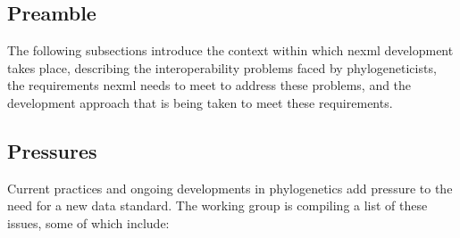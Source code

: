 \documentclass{article}
\begin{document}
\subsection{Preamble} The following subsections introduce the context
within which nexml development takes place, describing the
interoperability problems faced by phylogeneticists, the requirements
nexml needs to meet to address these problems, and the development
approach that is being taken to meet these requirements.

\subsection{Pressures} Current practices and ongoing developments in
phylogenetics add pressure to the need for a new data standard. The
working group is compiling a list of these issues, some of which
include:
\end{document}
